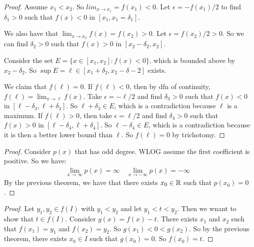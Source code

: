 \documentclass{report}
\begin{document}
\begin{proof}
    Assume $x_1 < x_2$. So $
    lim_{x \to x_1} = f(x_1) < 0$. Let $\epsilon = -f(x_1)/2$ to find $\delta_1 > 0$ such that $f(x) < 0$ in $[x_1, x_1 = \delta_1]$. 

    We also have that $\lim_{x \to x_2} f(x) = f(x_2) > 0$. Let $\epsilon = f(x_2)/2 > 0$. So we can find $\delta_2 > 0$ such that $f(x) > 0$ in $[x_2 - \delta_2, x_2]$.

    Consider the set $E = \{ x \in [x_1, x_2] : f(x) < 0\}$, which is bounded above by $x_2 - \delta_2$. So $\sup E = \ell \in [x_1 + \delta_2, x_2 - \delta-2]$ exists.
    
    We claim that $f(\ell) = 0$. If $f(\ell) < 0$, then by dfn of continuity, $f(\ell) = \lim_{x \to \ell} f(x)$. Take $\epsilon = -\ell / 2$ and find $\delta_3 > 0$ such that $f(x) < 0$ in $[\ell - \delta_3, \ell + \delta_3]$. So $\ell + \delta_3 \in E$, which is a contradiction because $\ell$ is a maximum. If $f(\ell) > 0$, then take $\epsilon = \ell / 2$ and find $\delta_4 > 0$ such that $f(x) > 0$ in $[\ell - \delta_4, \ell + \delta_4]$. So $\ell - \delta_4 \in E$, which is a contradiction because it is then a better lower bound than $\ell$. So $f(\ell) = 0$ by trichotomy.
\end{proof}
\begin{proof}
    Consider $p(x)$ that has odd degree. WLOG assume the first coefficient is positive. So we have:
    \begin{align*}
        \lim_{x\to \infty} p(x) = \infty \quad \lim_{x \to -\infty} p(x) = -\infty
    \end{align*}
    By the previous theorem, we have that there exists $x_0 \in \RR$ such that $p(x_0) = 0$.
\end{proof}

\begin{proof}
    Let $y_1, y_2 \in f(I)$ with $y_1 < y_2$ and let $y_1 < t < y_2$. Then we wnant to show that $t \in f(I)$. Consider $g(x) = f(x) - t$. There exists $x_1$ and $x_2$ such that $f(x_1) = y_1$ and $f(x_2) = y_2$. So $g(x_1) < 0 < g(x_2)$. So by the previous theorem, there exists $x_0 \in I$ such that $g(x_0) = 0$. So $f(x_0) = t$.
\end{proof}
\end{document}
